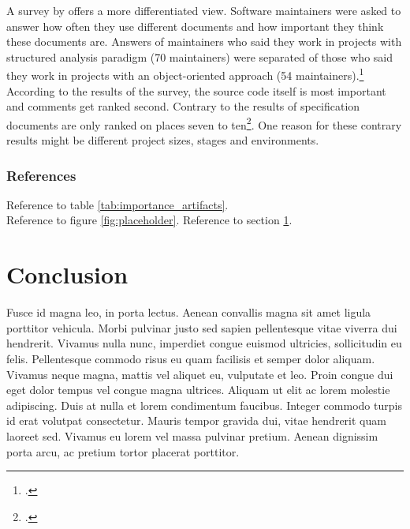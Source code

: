 A survey by \citeauthor{de_souza_study_2005} offers a more differentiated view.
Software maintainers were asked to answer how often they use different documents
and how important they think these documents are. Answers of maintainers who
said they work in projects with structured analysis paradigm (70 maintainers)
were separated of those who said they work in projects with an object-oriented
approach (54 maintainers).\footcite[Cf.][69-74]{de_souza_study_2005}
According to the results of the survey, the source code itself is most important
and comments get ranked second. Contrary to the results of \citeauthor{forward_relevance_2002}
specification documents are only ranked on places seven to
ten\footcite[Cf.][98]{huang_towards_2003}. One reason for these contrary results
might be different project sizes, stages and environments.

\subsubsection{References}

Reference to table \ref{tab:importance_artifacts}.\\
Reference to figure \ref{fig:placeholder}.
Reference to section \ref{sec:conclusion}.


\newpage


\section{Conclusion}
\label{sec:conclusion}

Fusce id magna leo, in porta lectus. Aenean convallis magna sit amet ligula
porttitor vehicula. Morbi pulvinar justo sed sapien pellentesque vitae viverra
dui hendrerit. Vivamus nulla nunc, imperdiet congue euismod ultricies,
sollicitudin eu felis. Pellentesque commodo risus eu quam facilisis et semper
dolor aliquam. Vivamus neque magna, mattis vel aliquet eu, vulputate et leo.
Proin congue dui eget dolor tempus vel congue magna ultrices. Aliquam ut elit
ac lorem molestie adipiscing. Duis at nulla et lorem condimentum faucibus.
Integer commodo turpis id erat volutpat consectetur. Mauris tempor gravida
dui, vitae hendrerit quam laoreet sed. Vivamus eu lorem vel massa pulvinar
pretium. Aenean dignissim porta arcu, ac pretium tortor placerat porttitor. 







